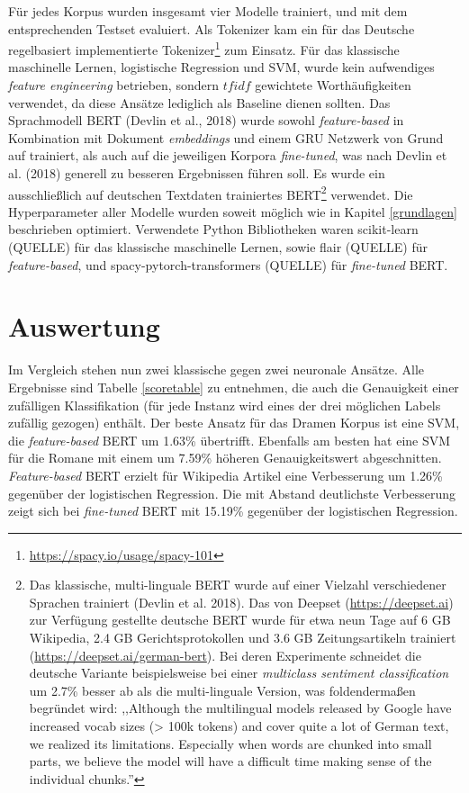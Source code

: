 Für jedes Korpus wurden insgesamt vier Modelle trainiert, und mit dem entsprechenden Testset evaluiert. Als Tokenizer kam ein für das Deutsche regelbasiert implementierte Tokenizer\footnote{\url{https://spacy.io/usage/spacy-101}} zum Einsatz. Für das klassische maschinelle Lernen, logistische Regression und SVM, wurde kein aufwendiges \textit{feature engineering} betrieben, sondern $tfidf$ gewichtete Worthäufigkeiten verwendet, da diese Ansätze lediglich als Baseline dienen sollten. Das Sprachmodell BERT (Devlin et al., 2018) wurde sowohl \textit{feature-based} in Kombination mit Dokument \textit{embeddings} und einem GRU Netzwerk von Grund auf trainiert, als auch auf die jeweiligen Korpora \textit{fine-tuned}, was nach Devlin et al. (2018) generell zu besseren Ergebnissen führen soll. Es wurde ein ausschließlich auf deutschen Textdaten trainiertes BERT\footnote{Das klassische, multi-linguale BERT wurde auf einer Vielzahl verschiedener Sprachen trainiert (Devlin et al. 2018). Das von Deepset (\url{https://deepset.ai}) zur Verfügung gestellte deutsche BERT wurde für etwa neun Tage auf 6 GB Wikipedia, 2.4 GB Gerichtsprotokollen und 3.6 GB Zeitungsartikeln trainiert (\url{https://deepset.ai/german-bert}). Bei deren Experimente schneidet die deutsche Variante beispielsweise bei einer \textit{multiclass sentiment classification} um 2.7\% besser ab als die multi-linguale Version, was foldendermaßen begründet wird: ,,Although the multilingual models released by Google have increased vocab sizes (> 100k tokens) and cover quite a lot of German text, we realized its limitations. Especially when words are chunked into small parts, we believe the model will have a difficult time making sense of the individual chunks.''} verwendet. Die Hyperparameter aller Modelle wurden soweit möglich wie in Kapitel \ref{grundlagen} beschrieben optimiert.
Verwendete Python Bibliotheken waren scikit-learn (QUELLE) für das klassische maschinelle Lernen, sowie flair (QUELLE) für \textit{feature-based}, und spacy-pytorch-transformers (QUELLE) für \textit{fine-tuned} BERT.



\section{Auswertung}
\label{auswertung}

Im Vergleich stehen nun zwei klassische gegen zwei neuronale Ansätze. Alle Ergebnisse sind Tabelle \ref{scoretable} zu entnehmen, die auch die Genauigkeit einer zufälligen Klassifikation (für jede Instanz wird eines der drei möglichen Labels zufällig gezogen) enthält. Der beste Ansatz für das Dramen Korpus ist eine SVM, die \textit{feature-based} BERT um 1.63\% übertrifft. Ebenfalls am besten hat eine SVM für die Romane mit einem um 7.59\% höheren Genauigkeitswert abgeschnitten. \textit{Feature-based} BERT erzielt für Wikipedia Artikel eine Verbesserung um 1.26\% gegenüber der logistischen Regression. Die mit Abstand deutlichste Verbesserung zeigt sich bei \textit{fine-tuned} BERT mit 15.19\% gegenüber der logistischen Regression.

